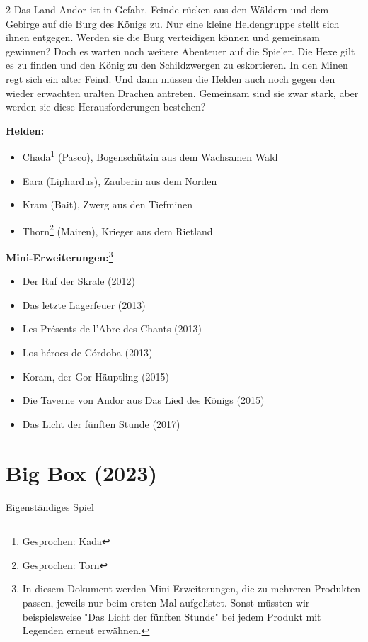\documentclass[10pt, a4paper, oneside]{book}
\newcommand{\fillbreak}{\vspace*{\fill}\columnbreak}
\newcommand{\produkt}[1]{%
    \section{#1}%
    \label{Produkt: #1}%
}
\newcommand{\refprodukt}[1]{\hyperref[Produkt: #1]{#1}}
\begin{document}
\begin{multicols}{2}
Das Land Andor ist in Gefahr. Feinde rücken aus den Wäldern und dem Gebirge auf die Burg des Königs zu. Nur eine kleine Heldengruppe stellt sich ihnen entgegen. Werden sie die Burg verteidigen können und gemeinsam gewinnen? Doch es warten noch weitere Abenteuer auf die Spieler. Die Hexe gilt es zu finden und den König zu den Schildzwergen zu eskortieren.
In den Minen regt sich ein alter Feind. Und dann müssen die Helden auch noch gegen den wieder erwachten uralten Drachen antreten. Gemeinsam sind sie zwar stark, aber werden sie diese Herausforderungen bestehen?\bigskip

\textbf{Helden:}

\begin{itemize}[topsep=0pt,itemsep=-1ex,partopsep=1ex,parsep=1ex]
    \item Chada\footnote{Gesprochen: Kada} (Pasco), Bogenschützin aus dem Wachsamen Wald
    \item Eara (Liphardus), Zauberin aus dem Norden
    \item Kram (Bait), Zwerg aus den Tiefminen
    \item Thorn\footnote{Gesprochen: Torn} (Mairen), Krieger aus dem Rietland
\end{itemize}

\textbf{Mini-Erweiterungen:}\footnote{In diesem Dokument werden Mini-Erweiterungen, die zu mehreren Produkten passen, jeweils nur beim ersten Mal aufgelistet. Sonst müssten wir beispielsweise "Das Licht der fünften Stunde" bei jedem Produkt mit Legenden erneut erwähnen.}

\begin{itemize}[topsep=0pt,itemsep=-1ex,partopsep=1ex,parsep=1ex]
    \item Der Ruf der Skrale (2012)
    \item Das letzte Lagerfeuer (2013)
    \item Les Présents de l'Abre des Chants (2013)
    \item Los héroes de Córdoba (2013)
    \item Koram, der Gor-Häuptling (2015)
    \item Die Taverne von Andor aus \refprodukt{Das Lied des Königs (2015)}
    \item Das Licht der fünften Stunde (2017)
\end{itemize}




\fillbreak
\produkt{Big Box (2023)}



\begin{center}
    Eigenständiges Spiel
\end{center}


\end{multicols}
\end{document}
